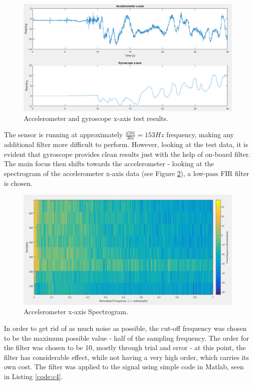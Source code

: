 \begin{figure}[H]
  \centering
    \includegraphics[width=1\textwidth]{images/MPUXPlot.png}
	\caption{Accelerometer and gyroscope x-axis test results.}
	\label{dataPlot}
\end{figure}

The sensor is running at approximately $\frac{4591}{30s} = 153Hz$ frequency, making any additional filter more difficult to perform. However, looking at the test data, it is evident that gyroscope provides clean results just with the help of on-board filter. The main focus then shifts towards the accelerometer - looking at the spectrogram of the accelerometer x-axis data (see Figure \ref{spectrogram}), a low-pass FIR filter is chosen.

\begin{figure}[H]
  \centering
    \includegraphics[width=1\textwidth]{images/spectrogram.png}
	\caption{Accelerometer x-axis Spectrogram.}
	\label{spectrogram}
\end{figure}

In order to get rid of as much noise as possible, the cut-off frequency was chosen to be the maximum possible value - half of the sampling frequency. The order for the filter was chosen to be 10, mostly through trial and error - at this point, the filter has considerable effect, while not having a very high order, which carries its own cost. The filter was applied to the signal using simple code in Matlab, seen in Listing \ref{code:c4}.

